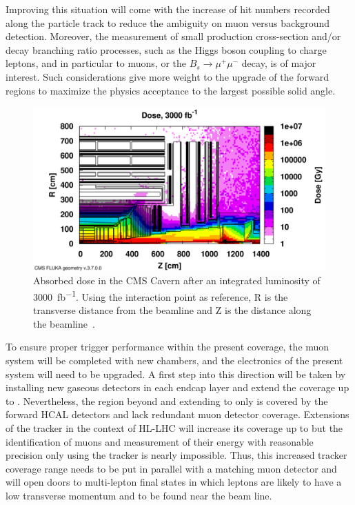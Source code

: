 	Improving this situation will come with the increase of hit numbers recorded along the particle track to reduce the ambiguity on muon versus background detection. Moreover, the measurement of small production cross-section and/or decay branching ratio processes, such as the Higgs boson coupling to charge leptons, and in particular to muons, or the $B_s \rightarrow \mu^+\mu^-$ decay, is of major interest. Such considerations give more weight to the upgrade of the forward regions to maximize the physics acceptance to the largest possible solid angle.
	
\endgroup
\begingroup\setlength{\intextsep}{0pt}\setlength{\columnsep}{15pt}

	\begin{figure}
		\centering
		\vspace{25pt}
		\includegraphics[width=\linewidth]{fig/chapt4/HL-LHC-Dose.png}
		\caption{\label{fig:Dose} Absorbed dose in the CMS Cavern after an integrated luminosity of \SI{3000}{fb^{-1}}. Using the interaction point as reference, R is the transverse distance from the beamline and Z is the distance along the beamline~\cite{PHASEIITP}.}
	\end{figure}
	
	To ensure proper trigger performance within the present coverage, the muon system will be completed with new chambers, and the electronics of the present system will need to be upgraded. A first step into this direction will be taken by installing new gaseous detectors in each endcap layer and extend the coverage up to . Nevertheless, the region beyond  and extending to  only is covered by the forward HCAL detectors and lack redundant muon detector coverage. Extensions of the tracker in the context of HL-LHC will increase its coverage up to  but the identification of muons and measurement of their energy with reasonable precision only using the tracker is nearly impossible. Thus, this increased tracker coverage range needs to be put in parallel with a matching muon detector and will open doors to multi-lepton final states in which leptons are likely to have a low transverse momentum and to be found near the beam line.
	
